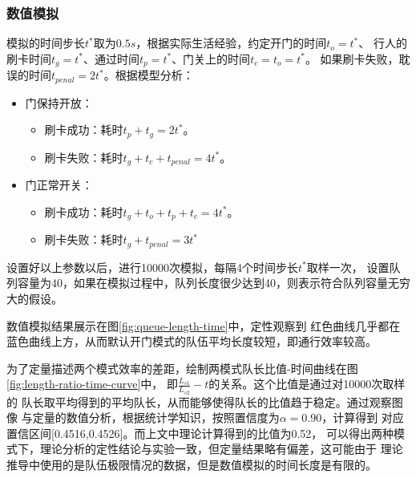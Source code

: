 \subsubsection{数值模拟}
模拟的时间步长$t^*$取为$0.5s$，根据实际生活经验，约定开门的时间$t_o=t^*$、
行人的刷卡时间$t_g=t^*$、通过时间$t_p=t^*$、门关上的时间$t_c=t_o=t^*$。
如果刷卡失败，耽误的时间$t_{penal}=2t^*$。根据模型分析：
\begin{itemize}
    \item 门保持开放：
    \begin{itemize}
        \item 刷卡成功：耗时$t_p+t_g=2t^*$。
        \item 刷卡失败：耗时$t_g+t_c+t_{penal}=4t^*$。
    \end{itemize}
    \item 门正常开关：
    \begin{itemize}
        \item 刷卡成功：耗时$t_g+t_o+t_p+t_c=4t^*$。
        \item 刷卡失败：耗时$t_g+t_{penal}=3t^*$
    \end{itemize}
\end{itemize}
设置好以上参数以后，进行10000次模拟，每隔4个时间步长$t^*$取样一次，
设置队列容量为40，如果在模拟过程中，队列长度很少达到40，则表示符合队列容量无穷大的假设。
\par 数值模拟结果展示在图\ref{fig:queue-length-time}中，定性观察到
红色曲线几乎都在蓝色曲线上方，从而默认开门模式的队伍平均长度较短，即通行效率较高。
\par 为了定量描述两个模式效率的差距，绘制两模式队长比值-时间曲线在图\ref{fig:length-ratio-time-curve}中，
即$\frac{L_{s1}}{L_{s2}}-t$的关系。这个比值是通过对10000次取样的
队长取平均得到的平均队长，从而能够使得队长的比值趋于稳定。通过观察图像
与定量的数值分析，根据统计学知识，按照置信度为$\alpha=0.90$，计算得到
对应置信区间[0.4516,0.4526]。而上文中理论计算得到的比值为0.52，
可以得出两种模式下，理论分析的定性结论与实验一致，但定量结果略有偏差，这可能由于
理论推导中使用的是队伍极限情况的数据，但是数值模拟的时间长度是有限的。
